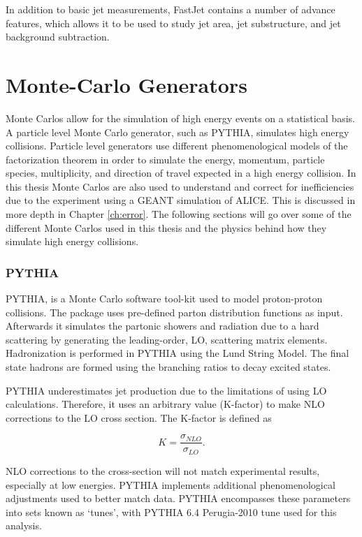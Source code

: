 \noindent
In addition to basic jet measurements, FastJet contains a number of advance features, which allows it to be used to study jet area, jet substructure, and jet background subtraction\cite{Connors:2017ptx}.

\section{Monte-Carlo Generators}
Monte Carlos allow for the simulation of high energy events on a statistical basis.  A particle level Monte Carlo generator, such as PYTHIA, simulates high energy collisions.  Particle level generators use different phenomenological models of the factorization theorem in order to simulate the energy, momentum, particle species, multiplicity, and direction of travel expected in a high energy collision.  In this thesis Monte Carlos are also used to understand and correct for inefficiencies due to the experiment using a GEANT simulation of ALICE.  This is discussed in more depth in Chapter \ref{ch:error}.  The following sections will go over some of the different Monte Carlos used in this thesis and the physics behind how they simulate high energy collisions.

\subsubsection{PYTHIA}

PYTHIA\cite{Sjostrand:2007gs}, is a Monte Carlo software tool-kit used to model proton-proton collisions.  The package uses pre-defined parton distribution functions as input.  Afterwards it simulates the partonic showers and radiation due to a hard scattering by generating the leading-order, LO, scattering matrix elements.  Hadronization is performed in PYTHIA using the Lund String Model.  The final state hadrons are formed using the branching ratios to decay excited states.

PYTHIA underestimates jet production due to the limitations of using LO calculations.  Therefore, it uses an arbitrary value (K-factor) to make NLO corrections to the LO cross section.  The K-factor is defined as

\begin{equation}
K = \frac{\sigma_{NLO}}{\sigma_{LO}}.
\label{eq:Kfactor}
\end{equation}

NLO corrections to the cross-section will not match experimental results, especially at low energies.  PYTHIA implements additional phenomenological adjustments used to better match data.  PYTHIA encompasses these parameters into sets known as `tunes', with PYTHIA 6.4 Perugia-2010 tune used for this analysis\cite{Skands:2010ak}.

